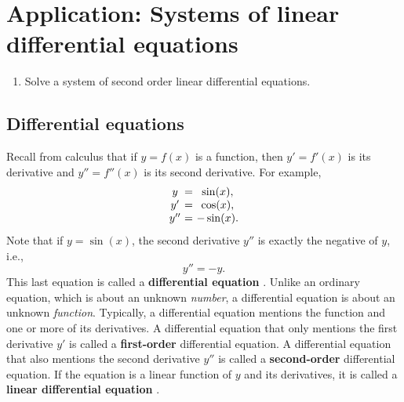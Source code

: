\section{Application: Systems of linear differential equations}

\begin{outcome}
  \begin{enumerate}
  \item Solve a system of second order linear differential equations.
  \end{enumerate}
\end{outcome}

\subsection{Differential equations}

Recall from calculus that if $y=f(x)$ is a function, then $y' = f'(x)$
is its derivative%
 and $y'' = f''(x)$ is its second derivative.  For
example,
\begin{equation*}
  \begin{array}{c@{~}c@{~}c}
    y &=& \sin(x),\\
    y' &=& \cos(x),\\
    y''&=& -\sin(x).\\
  \end{array}
\end{equation*}
Note that if $y=\sin(x)$, the second derivative $y''$ is exactly the
negative of $y$, i.e.,
\begin{equation*}
  y'' = -y.
\end{equation*}
This last equation is called a \textbf{differential equation}%
%
. Unlike an ordinary equation, which is
about an unknown {\em number}, a differential equation is about an
unknown {\em function}. Typically, a differential equation mentions
the function and one or more of its derivatives. A differential
equation that only mentions the first derivative $y'$ is called a
\textbf{first-order}%
 differential equation. A
differential equation that also mentions the second derivative $y''$
is called a \textbf{second-order}%
 differential equation.
If the equation is a linear function of $y$ and its derivatives, it is
called a \textbf{linear differential equation}%
%
.

